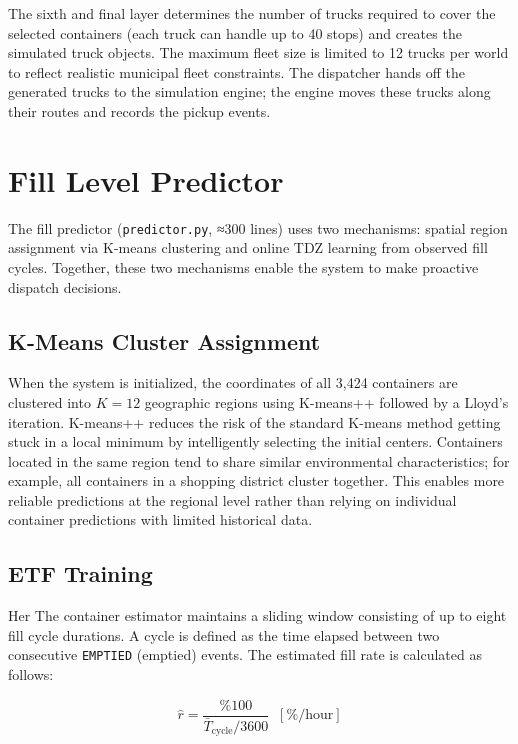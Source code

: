 \documentclass[12pt,a4paper]{report}
\begin{document}
\indent The sixth and final layer determines the number of trucks required to cover the selected containers (each truck can handle up to 40 stops) and creates the simulated truck objects. The maximum fleet size is limited to 12 trucks per world to reflect realistic municipal fleet constraints. The dispatcher hands off the generated trucks to the simulation engine; the engine moves these trucks along their routes and records the pickup events.

\section{Fill Level Predictor}

\indent The fill predictor (\texttt{predictor.py}, ≈300 lines) uses two mechanisms: spatial region assignment via K-means clustering and online TDZ learning from observed fill cycles. Together, these two mechanisms enable the system to make proactive dispatch decisions.

\subsection{K-Means Cluster Assignment}

\indent When the system is initialized, the coordinates of all 3,424 containers are clustered into $K = 12$ geographic regions using K-means++ followed by a Lloyd’s iteration. K-means++ reduces the risk of the standard K-means method getting stuck in a local minimum by intelligently selecting the initial centers. Containers located in the same region tend to share similar environmental characteristics; for example, all containers in a shopping district cluster together. This enables more reliable predictions at the regional level rather than relying on individual container predictions with limited historical data.

\subsection{ETF Training }

\indent Her The container estimator maintains a sliding window consisting of up to eight fill cycle durations. A cycle is defined as the time elapsed between two consecutive \texttt{EMPTIED} (emptied) events. The estimated fill rate is calculated as follows:

\begin{equation}
  \hat{r} = \frac{\%100}{\bar{T}_{\text{cycle}} / 3600}\;\; [\%/\text{hour}]
  \label{eq:fill_rate}
\end{equation}
\end{document}
